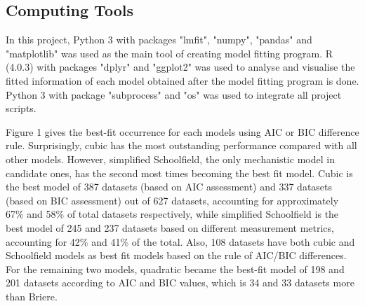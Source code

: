 \subsection{Computing Tools}

In this project, Python 3 with packages "lmfit", "numpy", "pandas" and "matplotlib" was used as the main tool of creating model fitting program. R (4.0.3) with packages "dplyr" and "ggplot2" was used to analyse and visualise the fitted information of each model obtained after the model fitting program is done. Python 3 with package "subprocess" and "os" was used to integrate all project scripts.


Figure 1 gives the best-fit occurrence for each models using AIC or BIC difference rule. Surprisingly, cubic has the most outstanding performance compared with all other models. However, simplified Schoolfield, the only mechanistic model in candidate ones, has the second most times becoming the best fit model. Cubic is the best model of 387 datasets (based on AIC assessment) and 337 datasets (based on BIC assessment) out of 627 datasets, accounting for approximately 67\% and 58\% of total datasets respectively, while simplified Schoolfield is the best model of 245 and 237 datasets based on different measurement metrics, accounting for 42\% and 41\% of the total. Also, 108 datasets have both cubic and Schoolfield models as best fit models based on the rule of AIC/BIC differences. For the remaining two models, quadratic became the best-fit model of 198 and 201 datasets according to AIC and BIC values, which is 34 and 33 datasets more than Briere.


